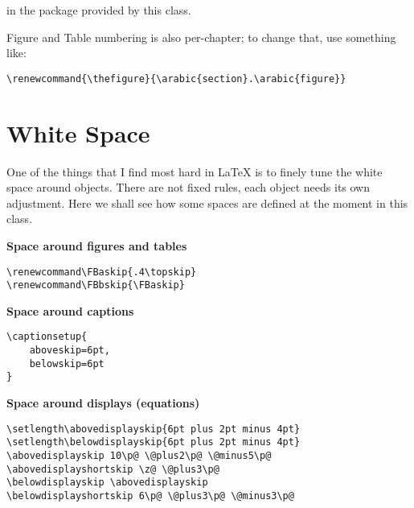 in the  package provided by this class.

Figure and Table numbering is also per-chapter; to change that, use 
something like:

\begin{lstlisting}[style=kaolstplain]
\renewcommand{\thefigure}{\arabic{section}.\arabic{figure}}
\end{lstlisting}

\section{White Space}

One of the things that I find most hard in \LaTeX\xspace is to finely 
tune the white space around objects. There are not fixed rules, each 
object needs its own adjustment. Here we shall see how some spaces are 
defined at the moment in this class.

\textbf{Space around figures and tables}

\begin{lstlisting}[style=kaolstplain]
\renewcommand\FBaskip{.4\topskip}
\renewcommand\FBbskip{\FBaskip}
\end{lstlisting}

\textbf{Space around captions}

\begin{lstlisting}[style=kaolstplain]
\captionsetup{
	aboveskip=6pt,
	belowskip=6pt
}
\end{lstlisting}

\textbf{Space around displays (\eg equations)}

\begin{lstlisting}[style=kaolstplain]
\setlength\abovedisplayskip{6pt plus 2pt minus 4pt}
\setlength\belowdisplayskip{6pt plus 2pt minus 4pt}
\abovedisplayskip 10\p@ \@plus2\p@ \@minus5\p@
\abovedisplayshortskip \z@ \@plus3\p@
\belowdisplayskip \abovedisplayskip
\belowdisplayshortskip 6\p@ \@plus3\p@ \@minus3\p@
\end{lstlisting}
